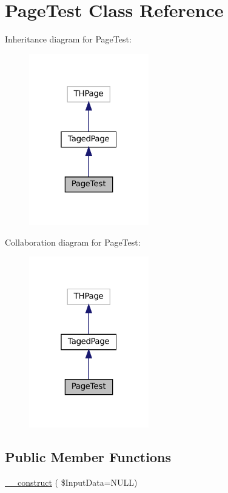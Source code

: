 \hypertarget{class_page_test}{}\section{Page\+Test Class Reference}
\label{class_page_test}


Inheritance diagram for Page\+Test\+:\nopagebreak
\begin{figure}[H]
\begin{center}
\leavevmode
\includegraphics[width=148pt]{class_page_test__inherit__graph}
\end{center}
\end{figure}


Collaboration diagram for Page\+Test\+:\nopagebreak
\begin{figure}[H]
\begin{center}
\leavevmode
\includegraphics[width=148pt]{class_page_test__coll__graph}
\end{center}
\end{figure}
\subsection*{Public Member Functions}
\begin{DoxyCompactItemize}
\item 
\hyperlink{class_page_test_a808f30b68701ec7ae61f5b8cde69915b}{\+\_\+\+\_\+construct} ( \$Input\+Data=N\+U\+LL)
\end{DoxyCompactItemize}
